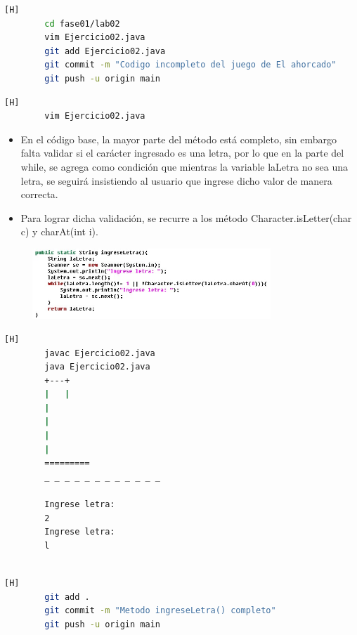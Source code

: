 \documentclass{article}
\begin{document}
	\begin{lstlisting}[language=bash,caption={Primer Commit Creando archivo Ejercicio02.java con el código incompleto }][H]
		cd fase01/lab02
		vim Ejercicio02.java
		git add Ejercicio02.java
		git commit -m "Codigo incompleto del juego de El ahorcado"			
		git push -u origin main
	\end{lstlisting}
	
	\begin{lstlisting}[language=bash,caption={Completando el método ingreseLetra }][H]
		vim Ejercicio02.java
	\end{lstlisting}
	\begin{itemize}	
		\item En el código base, la mayor parte del método está completo, sin embargo falta validar si el carácter ingresado es una letra, por lo que en la parte del while, se agrega como condición que mientras la variable laLetra no sea una letra, se seguirá insistiendo al usuario que ingrese dicho valor de manera correcta. 
		\item Para lograr dicha validación, se recurre a los método Character.isLetter(char c) y charAt(int i).
	\end{itemize}	
	\begin{figure}[H]
		\centering
		\includegraphics[width=0.8\textwidth,keepaspectratio]{img/metodoIngreseLetra.jpg}
	\end{figure}
	
	\begin{lstlisting}[language=bash,caption={Probando el método ingreseLetra}][H]
		javac Ejercicio02.java
		java Ejercicio02.java
		+---+
		|   |
		|
		|
		|
		|
		=========
		_ _ _ _ _ _ _ _ _ _ _ _
		
		Ingrese letra:
		2
		Ingrese letra:
		l
	
	\end{lstlisting}
	\begin{lstlisting}[language=bash,caption={Commit: Subiendo al repositorio Ejercicio02.java}][H]
		git add .
		git commit -m "Metodo ingreseLetra() completo"			
		git push -u origin main
	\end{lstlisting}
	
\end{document}
